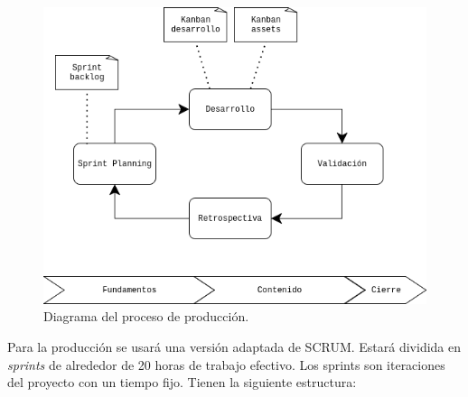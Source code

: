 \begin{figure}[H]
    \centering
    \includegraphics[scale=0.50]{img/production.drawio.png}
    \caption[Diagrama de produccion]{Diagrama del proceso de producción.}
    \label{fig:production}
\end{figure}


Para la producción se usará una versión adaptada de SCRUM. Estará dividida en \textit{sprints} de alrededor de 20 horas de trabajo efectivo. Los sprints son iteraciones del proyecto con un tiempo fijo. Tienen la siguiente estructura:

